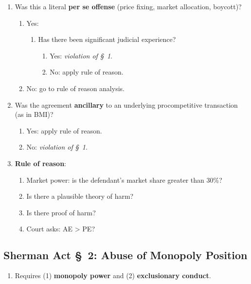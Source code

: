 \begin{enumerate}
    \item Was this a literal \textbf{per se offense} (price fixing, market 
    allocation, boycott)?
    \begin{enumerate}
        \item Yes:
        \begin{enumerate}
            \item Has there been significant judicial experience?
            \begin{enumerate}
                \item Yes: \emph{violation of \S\ 1}.
                \item No: apply rule of reason.
            \end{enumerate}
        \end{enumerate}
        \item No: go to rule of reason analysis.
    \end{enumerate}
    \item Was the agreement \textbf{ancillary} to an underlying procompetitive 
    transaction (as in BMI)?
    \begin{enumerate}
        \item Yes: apply rule of reason.
        \item No: \emph{violation of \S\ 1}.
    \end{enumerate}
    \item \textbf{Rule of reason}:
    \begin{enumerate}
        \item Market power: is the defendant's market share greater than 30\%?
        \item Is there a plausible theory of harm?
        \item Is there proof of harm?
        \item Court asks: AE > PE?
    \end{enumerate}
\end{enumerate}

\newpage

\subsection{Sherman Act \S\ 2: Abuse of Monopoly Position}

\begin{enumerate}
    \item Requires (1) \textbf{monopoly power} and (2) \textbf{exclusionary 
    conduct}.
\end{enumerate}

